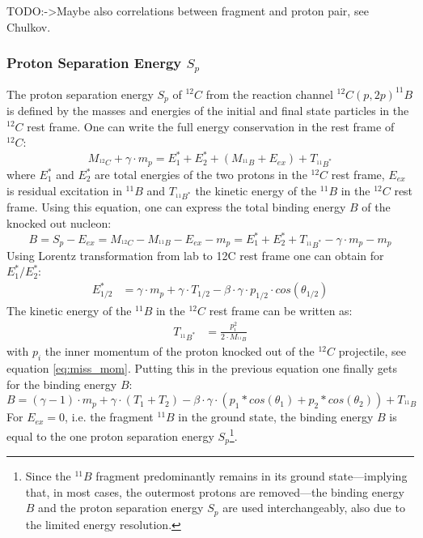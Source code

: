 TODO:->Maybe also correlations between fragment and proton pair, see Chulkov.


\subsubsection{Proton Separation Energy $S_p$}
The proton separation energy $S_p$ of $^{12}C$ from the reaction channel $^{12}C(p,2p)^{11}B$ is defined by the masses and energies of the initial and final state particles in the $^{12}C$ rest frame. One can write the full energy conservation in the rest frame of $^{12}C$:
\begin{equation}
M_{^{12}C} + \gamma \cdot m_p = E_1^* + E_2^* + (M_{^{11}B} + E_{ex})  + T_{^{11}B^*}
\end{equation}
where $E_1^*$ and $E_2^*$ are total energies of the two protons in the $^{12}C$ rest frame, $E_{ex}$ is residual excitation in $^{11}B$ and $T_{^{11}B^*}$ the kinetic energy of the $^{11}B$ in the $^{12}C$ rest frame.\newline
Using this equation, one can express the total binding energy $B$ of the knocked out nucleon:
\begin{equation}
B = S_p - E_{ex} = M_{^{12}C} - M_{^{11}B} - E_{ex} - m_p = E_1^* + E_2^* + T_{^{11}B^*} - \gamma \cdot m_p - m_p
\end{equation}
Using Lorentz transformation from lab to 12C rest frame one can obtain for $E_1^*/E_2^*$:
\begin{align*}
E_{1/2}^* &=  \gamma \cdot m_p + \gamma \cdot T_{1/2} - \beta \cdot \gamma \cdot p_{1/2} \cdot cos(\theta_{1/2})
\end{align*}
The kinetic energy of the $^{11}B$ in the $^{12}C$ rest frame can be written as:
\begin{align*}
T_{^{11}B^*} &= \frac{p_i^2}{2 \cdot M_{^{11}B}}
\end{align*}
with $p_i$ the inner momentum of the proton knocked out of the $^{12}C$ projectile, see equation \ref{eq:miss_mom}.
Putting this in the previous equation one finally gets for the binding energy $B$:
\begin{equation}
B = (\gamma - 1)\cdot m_p + \gamma \cdot (T_1+T_2) - \beta \cdot \gamma \cdot(p_1*cos(\theta_1) + p_2*cos(\theta_2)) + T_{^{11}B}
\end{equation}\label{eq:sep_energy}
For $E_{ex} = 0$, i.e. the fragment $^{11}B$ in the ground state, the binding energy $B$ is equal to the one proton separation energy $S_p$\footnote{Since the $^{11}B$ fragment predominantly remains in its ground state---implying that, in most cases, the outermost protons are removed---the binding energy $B$ and the proton separation energy $S_p$ are used interchangeably, also due to the limited energy resolution.}. \newline
